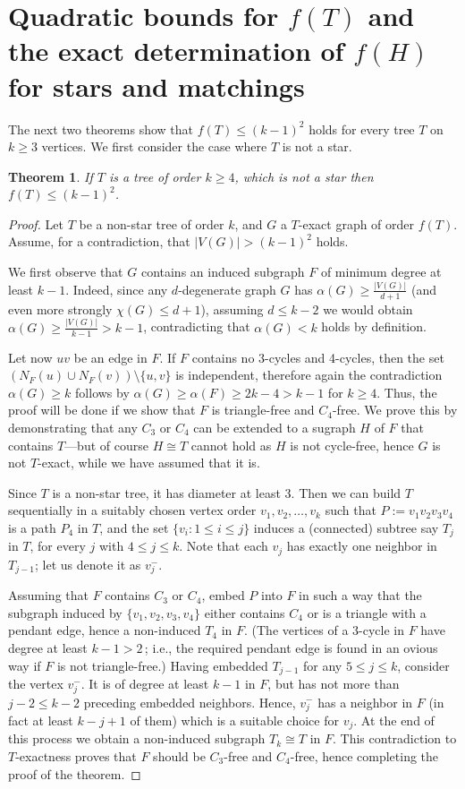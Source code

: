 \documentclass[a4paper,12pt]{article}
\newtheorem{theorem}{Theorem}[section]
\begin{document}
\section{Quadratic bounds for $f(T)$ and the exact determination of $f(H)$ for stars and matchings}

The next two theorems show that $f(T) \leq (k-1)^2$ holds for every tree $T$ on $k \geq 3$  vertices.  We first consider the case where $T$ is not a star.  
\begin{theorem}

If $T$ is a tree of order $k\geq 4$, which is not a star then $f(T) \leq (k-1)^2$.

\end{theorem}
\begin{proof}
	Let $T$ be a non-star tree of order $k$, and $G$ a $T$-exact graph of order $f(T)$.
	Assume, for a contradiction, that $|V(G)|>(k-1)^2$ holds.
	
	We first observe that $G$ contains an induced subgraph $F$ of minimum degree at least $k-1$.
	Indeed, since any $d$-degenerate graph $G$ has $\alpha(G)\geq\frac{|V(G)|}{d+1}$ (and even more strongly $\chi(G)\leq d+1$), assuming $d\leq k-2$ we would obtain $\alpha(G)  \geq \frac{|V(G)|}{k-1} > k-1$, contradicting that $\alpha(G) < k$ holds by definition.
	
	Let now $uv$ be an edge in $F$.
	If $F$ contains no 3-cycles and 4-cycles, then the set $(N_F(u) \cup N_F(v))\setminus \{u,v\}$ is independent, therefore again the contradiction $\alpha(G)\geq k$ follows by $\alpha(G)\geq \alpha(F)\geq 2k-4>k-1$ for $k\geq4$.
	Thus, the proof will be done if we show that $F$ is triangle-free and $C_4$-free.
	We prove this by demonstrating that any $C_3$ or $C_4$ can be extended to a sugraph $H$ of $F$ that contains $T$---but of course $H\cong T$ cannot hold as $H$ is not cycle-free, hence $G$ is not $T$-exact, while we have assumed that it is.

	Since $T$ is a non-star tree, it has diameter at least 3.
	Then we can build $T$ sequentially in a suitably chosen vertex order $v_1,v_2,\dots,v_k$ such that $P:=v_1v_2v_3v_4$ is a path $P_4$ in $T$, and the set $\{v_i : 1\leq i\leq j\}$ induces a (connected) subtree say $T_j$ in $T$, for every $j$ with $4\leq j\leq k$.
	Note that each $v_j$ has exactly one neighbor in $T_{j-1}$; let us denote it as $v_j^-$.
	
	Assuming that $F$ contains $C_3$ or $C_4$, embed $P$ into $F$ in such a way that the subgraph induced by $\{v_1,v_2,v_3,v_4\}$ either contains $C_4$ or is a triangle with a pendant edge, hence a non-induced $T_4$ in $F$.
	(The vertices of a 3-cycle in $F$ have degree at least $k-1>2$\,; i.e., the required pendant edge is found in an ovious way if $F$ is not triangle-free.)
	Having embedded $T_{j-1}$ for any $5\leq j\leq k$, consider the vertex $v_j^-$.
	It is of degree at least $k-1$ in $F$, but has not more than $j-2\leq k-2$ preceding embedded neighbors.
	Hence, $v_j^-$ has a neighbor in $F$ (in fact at least $k-j+1$ of them) which is a suitable choice for $v_j$.
	At the end of this process we obtain a non-induced subgraph $T_k\cong T$ in $F$.
	This contradiction to $T$-exactness proves that $F$ should be $C_3$-free and $C_4$-free, hence completing the proof of the theorem.
\end{proof}
\end{document}

